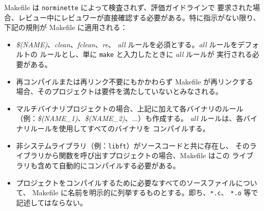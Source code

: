 \documentclass{42-ja}
\begin{document}
            Makefile は \texttt{norminette} によって検査されず、評価ガイドラインで
            要求された場合、レビュー中にレビュワーが直接確認する必要がある。特に指示がない限り、
            下記の規則が Makefile に適用される：
            \begin{itemize}

                \item \textit{\$(NAME)}、\textit{clean}、\textit{fclean}、\textit{re}、
                  \textit{all} ルールを必須とする。\textit{all} ルールをデフォルトの
                  ルールとし、単に \texttt{make} と入力したときに \textit{all} ルールが
                  実行される必要がある。

                \item 再コンパイルまたは再リンク不要にもかかわらず Makefile が再リンクする
                  場合、そのプロジェクトは要件を満たしていないとみなされる。

                \item マルチバイナリプロジェクトの場合、上記に加えて各バイナリのルール
                  （例：\textit{\$(NAME\_1)}、\textit{\$(NAME\_2)}、...）も作成する。
                  \textit{all} ルールは、各バイナリルールを使用してすべてのバイナリを
                  コンパイルする。

                \item 非システムライブラリ（例：\texttt{libft}）がソースコードと共に存在し、
                  そのライブラリから関数を呼び出すプロジェクトの場合、Makefile はこの
                  ライブラリも含めて自動的にコンパイルする必要がある。

                \item プロジェクトをコンパイルするために必要なすべてのソースファイルについて、
                  Makefile に名前を明示的に列挙するものとする。即ち、\texttt{*.c}、
                  \texttt{*.o} 等で記述してはならない。

            \end{itemize}


\end{document}
